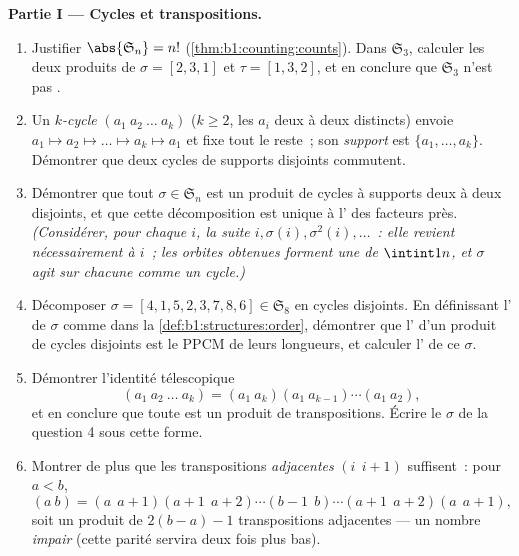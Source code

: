 \begin{problem}
\medskip
\noindent\textbf{Partie I --- Cycles et transpositions.}
\begin{enumerate}
  \item Justifier $\abs{\mathfrak S_n} = n!$
        (\cref{thm:b1:counting:counts}). Dans $\mathfrak S_3$,
        calculer les deux produits de $\sigma = [2, 3, 1]$ et $\tau =
        [1, 3, 2]$, et en conclure que $\mathfrak S_3$ n'est pas
        .
  \item Un \emph{$k$-cycle} $(a_1\ a_2\ \dots\ a_k)$ ($k \geq 2$,
        les $a_i$ deux à deux distincts) envoie $a_1 \mapsto a_2
        \mapsto \dots \mapsto a_k \mapsto a_1$ et fixe tout le
        reste~; son \emph{support} est $\{a_1, \dots, a_k\}$.
        Démontrer que deux cycles de supports disjoints commutent.
  \item Démontrer que tout $\sigma \in \mathfrak S_n$ est un produit
        de cycles à supports deux à deux disjoints, et que cette
        décomposition est unique à l' des facteurs près.
        \emph{(Considérer, pour chaque $i$, la suite $i, \sigma(i),
        \sigma^2(i), \dots$~: elle revient nécessairement à $i$~; les
        \emph{orbites} obtenues forment une  de
        $\intint1n$, et $\sigma$ agit sur chacune comme un cycle.)}
  \item Décomposer $\sigma = [4, 1, 5, 2, 3, 7, 8, 6] \in
        \mathfrak S_8$ en cycles disjoints. En définissant
        l'\emph{} de $\sigma$ comme dans
        la \cref{def:b1:structures:order}, démontrer que l' d'un
        produit de cycles disjoints est le PPCM de leurs longueurs,
        et calculer l' de ce $\sigma$.
  \item Démontrer l'identité télescopique
        \[
        (a_1\ a_2\ \dots\ a_k)
        = (a_1\ a_k)(a_1\ a_{k-1})\cdots(a_1\ a_2) ,
        \]
        et en conclure que toute  est un produit de
        transpositions. Écrire le $\sigma$ de la question 4 sous cette
        forme.
  \item Montrer de plus que les transpositions \emph{adjacentes}
        $(i\ \ i{+}1)$ suffisent~: pour $a < b$,
        \[
        (a\ b) = (a\ \ a{+}1)(a{+}1\ \ a{+}2)\cdots(b{-}1\ \ b)
        \cdots(a{+}1\ \ a{+}2)(a\ \ a{+}1),
        \]
        soit un produit de $2(b - a) - 1$ transpositions adjacentes ---
        un nombre \emph{impair} (cette parité servira deux fois plus
        bas).
\end{enumerate}


\end{problem}
